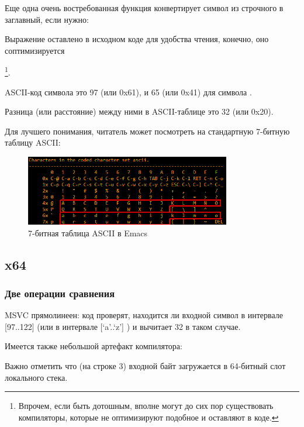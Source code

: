 
Еще одна очень востребованная функция конвертирует символ из строчного в заглавный, если нужно:



Выражение  оставлено в исходном коде для удобства чтения, 
конечно, оно соптимизируется

\footnote{Впрочем, если быть дотошным, вполне могут до сих пор существовать компиляторы,
которые не оптимизируют подобное и оставляют в коде.}.

\ac{ASCII}-код символа  это 97 (или 0x61), и 65 (или 0x41) для символа .

Разница (или расстояние) между ними в \ac{ASCII}-таблице это 32 (или 0x20).

Для лучшего понимания, читатель может посмотреть на стандартную 7-битную таблицу \ac{ASCII}:

\begin{figure}[H]
\centering
\includegraphics[width=0.8\textwidth]{ascii.png}
\caption{7-битная таблица \ac{ASCII} в Emacs}
\end{figure}

\subsection{x64}

\subsubsection{Две операции сравнения}

\NonOptimizing MSVC прямолинеен: код проверят, находится ли входной символ в интервале [97..122]
(или в интервале [`a'..`z'] ) и вычитает 32 в таком случае.

Имеется также небольшой артефакт компилятора:



Важно отметить что (на строке 3) входной байт загружается в 64-битный слот локального стека.

